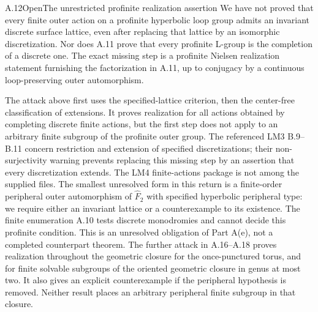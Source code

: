 \begin{statement}{A.12}{Open}{The unrestricted profinite realization assertion}
We have not proved that every finite outer action on a profinite
hyperbolic loop group admits an invariant discrete surface
lattice, even after replacing that lattice by an isomorphic
discretization. Nor does A.11 prove that every profinite
L-group is the completion of a discrete one. The exact missing
step is a profinite Nielsen realization statement furnishing
the factorization in A.11, up to conjugacy by a continuous
loop-preserving outer automorphism.
\end{statement}
The attack above first uses the specified-lattice criterion,
then the center-free classification of extensions. It proves
realization for all actions obtained by completing discrete
finite actions, but the first step does not apply to an
arbitrary finite subgroup of the profinite outer group.
The referenced LM3 B.9--B.11 concern restriction and extension
of specified discretizations; their non-surjectivity warning
prevents replacing this missing step by an assertion that
every discretization extends. The LM4 finite-actions package
is not among the supplied files. The smallest unresolved
form in this return is a finite-order peripheral outer
automorphism of $\widehat F_2$ with specified hyperbolic
peripheral type: we require either an invariant lattice or
a counterexample to its existence. The finite enumeration
A.10 tests discrete monodromies and cannot decide this
profinite condition. This is an unresolved obligation of
Part A(e), not a completed counterpart theorem. The further attack
in A.16--A.18 proves realization throughout the geometric closure
for the once-punctured torus, and for finite solvable subgroups of
the oriented geometric closure in genus at most two. It also gives
an explicit counterexample if the peripheral hypothesis is removed.
Neither result places an arbitrary peripheral finite subgroup in
that closure.

